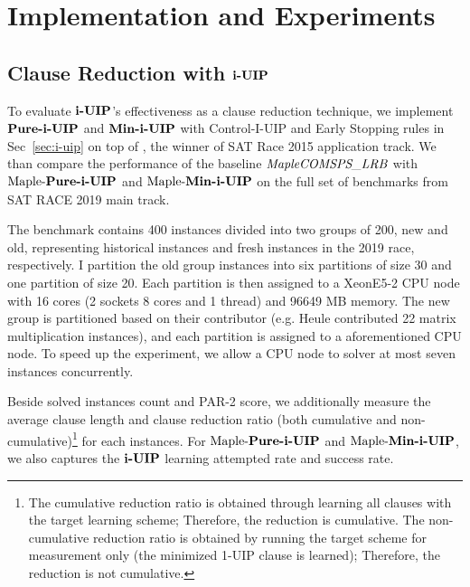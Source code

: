 \section{Implementation and Experiments}

\subsection{Clause Reduction with $\textbf{i-UIP}$}
To evaluate $\textbf{i-UIP}$'s effectiveness as a clause reduction technique, we implement  $\textbf{Pure-i-UIP}$ and $\textbf{Min-i-UIP}$ with Control-I-UIP and Early Stopping rules in Sec~\ref{sec:i-uip} on top of \text{\MapleBase} \cite{}, the winner of SAT Race 2015 application track.  We than compare the performance of the baseline $\textit{MapleCOMSPS\_LRB}$ with $\text{Maple-\textbf{Pure-i-UIP}}$ and $\text{Maple-\textbf{Min-i-UIP}}$ on the full set of benchmarks from SAT RACE 2019 main track.

The benchmark contains 400 instances divided into two groups of 200, new and old, representing historical instances and fresh instances in the 2019 race, respectively. I partition the old group instances into six partitions of size 30 and one partition of size 20. Each partition is then assigned to a XeonE5-2 CPU node with 16 cores (2 sockets 8 cores  and  1 thread) and 96649 MB memory. The new group is partitioned based on their contributor (e.g. Heule contributed 22 matrix multiplication instances), and each partition is assigned to a aforementioned CPU node. To speed up the experiment, we allow a CPU node to solver at most seven instances concurrently. 

Beside solved instances count and PAR-2 score, we additionally measure the average clause length and clause reduction ratio (both cumulative and non-cumulative)\footnote{The cumulative reduction ratio is obtained through learning all clauses with the target learning scheme; Therefore, the reduction is cumulative. The non-cumulative reduction ratio is obtained by running the target scheme for measurement only (the minimized 1-UIP clause is learned); Therefore, the reduction is not cumulative. }  for each instances. For $\text{Maple-\textbf{Pure-i-UIP}}$  and $\text{Maple-\textbf{Min-i-UIP}}$, we also captures the $\textbf{i-UIP}$ learning attempted rate and success rate.

